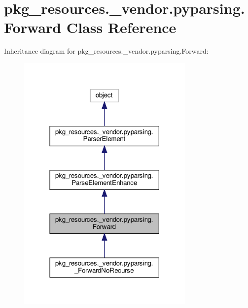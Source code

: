 \hypertarget{classpkg__resources_1_1__vendor_1_1pyparsing_1_1Forward}{}\section{pkg\+\_\+resources.\+\_\+vendor.\+pyparsing.\+Forward Class Reference}
\label{classpkg__resources_1_1__vendor_1_1pyparsing_1_1Forward}


Inheritance diagram for pkg\+\_\+resources.\+\_\+vendor.\+pyparsing.\+Forward\+:
\nopagebreak
\begin{figure}[H]
\begin{center}
\leavevmode
\includegraphics[width=246pt]{classpkg__resources_1_1__vendor_1_1pyparsing_1_1Forward__inherit__graph}
\end{center}
\end{figure}



